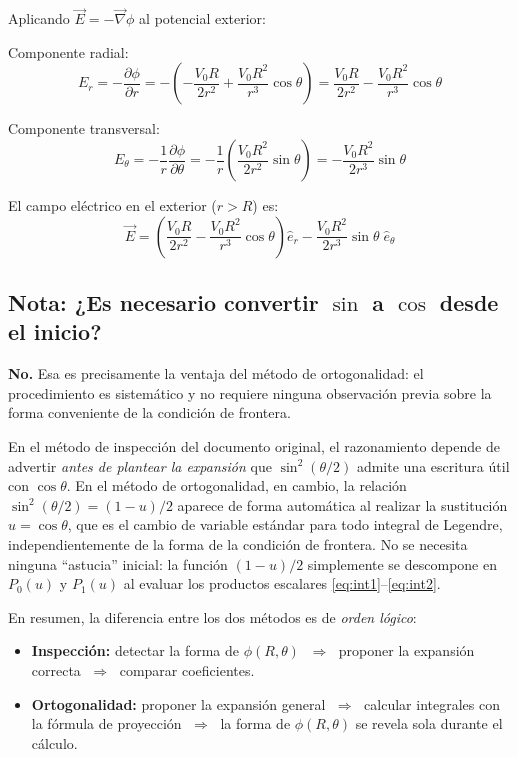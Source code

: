 \documentclass[a4paper]{article}
\begin{document}
Aplicando $\vec{E} = -\vec{\nabla}\phi$ al potencial exterior:

Componente radial:
\begin{equation}
    E_r = -\frac{\partial\phi}{\partial r}
        = -\!\left(-\frac{V_0 R}{2r^2} + \frac{V_0 R^2}{r^3}\cos\theta\right)
        = \frac{V_0 R}{2r^2} - \frac{V_0 R^2}{r^3}\cos\theta
\end{equation}

Componente transversal:
\begin{equation}
    E_\theta = -\frac{1}{r}\frac{\partial\phi}{\partial\theta}
             = -\frac{1}{r}\!\left(\frac{V_0 R^2}{2r^2}\sin\theta\right)
             = -\frac{V_0 R^2}{2r^3}\sin\theta
\end{equation}

El campo eléctrico en el exterior ($r > R$) es:
\begin{equation}
    \vec{E} = \left(\frac{V_0 R}{2r^2} - \frac{V_0 R^2}{r^3}\cos\theta\right)\hat{e}_r
            - \frac{V_0 R^2}{2r^3}\sin\theta\;\hat{e}_\theta
\end{equation}

\subsection*{Nota: ¿Es necesario convertir $\sin$ a $\cos$ desde el inicio?}

\textbf{No.} Esa es precisamente la ventaja del método de ortogonalidad: el procedimiento es
sistemático y no requiere ninguna observación previa sobre la forma conveniente de la condición
de frontera.

En el método de inspección del documento original, el razonamiento depende de advertir
\emph{antes de plantear la expansión} que $\sin^2(\theta/2)$ admite una escritura útil con
$\cos\theta$.  En el método de ortogonalidad, en cambio, la relación
$\sin^2(\theta/2) = (1-u)/2$ aparece de forma automática al realizar la sustitución
$u = \cos\theta$, que es el cambio de variable estándar para todo integral de Legendre,
independientemente de la forma de la condición de frontera.  No se necesita ninguna
``astucia'' inicial: la función $(1-u)/2$ simplemente se descompone en $P_0(u)$ y $P_1(u)$
al evaluar los productos escalares \eqref{eq:int1}--\eqref{eq:int2}.

En resumen, la diferencia entre los dos métodos es de \emph{orden lógico}:
\begin{itemize}
    \item \textbf{Inspección:} detectar la forma de $\phi(R,\theta)$ $\;\Rightarrow\;$
          proponer la expansión correcta $\;\Rightarrow\;$ comparar coeficientes.
    \item \textbf{Ortogonalidad:} proponer la expansión general $\;\Rightarrow\;$
          calcular integrales con la fórmula de proyección $\;\Rightarrow\;$
          la forma de $\phi(R,\theta)$ se revela sola durante el cálculo.
\end{itemize}



\end{document}
